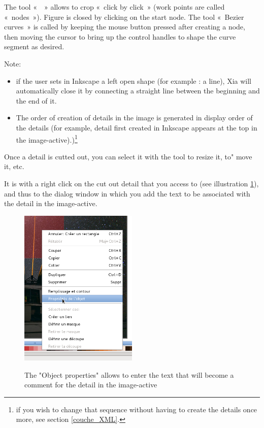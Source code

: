 {The tool «~~» 
allows to crop «~click by click~» (work points are called 
«~nodes~»).  Figure is closed by clicking on the start node. 
The tool «~Bezier curves~» is called by keeping the mouse button pressed 
after creating a node, then moving the cursor to bring up the control handles 
to shape the curve segment as desired.

Note:
\begin{itemize}
 \item if the user sets in Inkscape a left open shape (for
example : a line), Xia will automatically close it  by connecting a 
 straight line between the beginning and the end of it.
 \item The order of creation of details in the image is generated in display 
order of the details (for example, detail first created in
Inkscape appears at the top in the image-active).)\footnote{if you wish to 
change that sequence without having to create the details once more, see 
section \ref{couche_XML}.}
\end{itemize}

Once a detail is cutted out, you can select it with the tool  
 to resize it, to" 
move it, etc.

It is with a right click on the cut out detail that you access to 
 (see illustration \ref{proprietes_objet}), and 
thus to the dialog window in which you add the text to be associated with the 
detail in the image-active.

\begin{figure}[htp]
 \centering
 \caption{The "Object properties" allows to enter the text that will become a 
 comment for the detail in the image-active}
 \includegraphics[width=0.5\textwidth]{./images/proprietes_objet}
 \label{proprietes_objet}
\end{figure}

}
